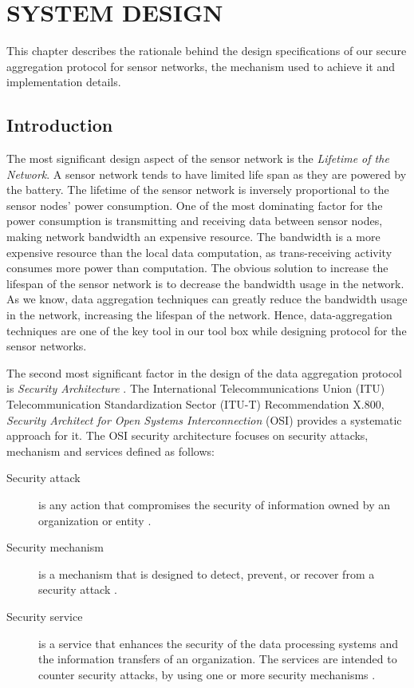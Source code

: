 \chapter{SYSTEM DESIGN} %
\label{cha:System Design}
	
	This chapter describes the rationale behind the design specifications of our secure aggregation protocol for sensor networks, the mechanism used to achieve it and implementation details.

	\section{Introduction}

	The most significant design aspect of the sensor network is the \textit{Lifetime of the Network}.
	A sensor network tends to have limited life span as they are powered by the battery.
	The lifetime of the sensor network is inversely proportional to the sensor nodes' power consumption.
	One of the most dominating factor for the power consumption is transmitting and receiving data between sensor nodes, making network bandwidth an expensive resource.
	The bandwidth is a more expensive resource than the local data computation, as trans-receiving activity consumes more power than computation.
	The obvious solution to increase the lifespan of the sensor network is to decrease the bandwidth usage in the network.
	As we know, data aggregation techniques can greatly reduce the bandwidth usage in the network, increasing the lifespan of the network.
	Hence, data-aggregation techniques are one of the key tool in our tool box while designing protocol for the sensor networks.

	The second most significant factor in the design of the data aggregation protocol is \textit{Security Architecture }.
	The International Telecommunications Union (ITU) Telecommunication Standardization Sector (ITU-T) Recommendation X.800, \textit{Security Architect for Open Systems Interconnection} (OSI) provides a systematic approach for it.
	The OSI security architecture focuses on security attacks, mechanism and services defined as follows:
	\begin{description}
		\item[Security attack] is any action that compromises the security of information owned by an organization or entity \cite{stallings2008computer}.
		\item[Security mechanism] is a mechanism that is designed to detect, prevent, or recover from a security attack
		\cite{stallings2008computer}.
		\item[Security service] is a service that enhances the security of the data processing systems and the information transfers of an organization. The services are intended to counter security attacks, by using one or more security mechanisms \cite{stallings2008computer}.

	\end{description}

